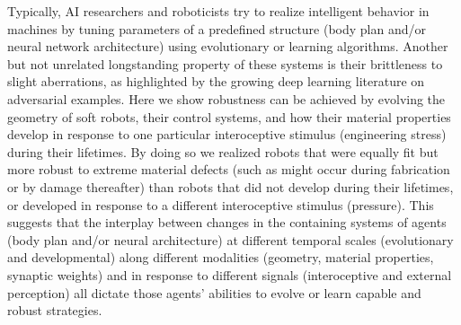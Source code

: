 \noindent
Typically, AI researchers and roboticists try to realize
intelligent behavior in machines by tuning parameters of a 
predefined structure (body plan and/or neural network
architecture) using evolutionary or learning algorithms. 
Another but not unrelated longstanding property of these systems is their brittleness to slight aberrations, as highlighted by the growing deep learning literature on adversarial examples.
Here we show robustness can be achieved by
evolving the 
geometry of soft robots, their
control systems, and how
their material properties develop
in response to one particular interoceptive stimulus
(engineering stress) during their lifetimes.
By doing so we realized robots that 
were equally fit but more robust to 
extreme material defects (such as 
might occur during fabrication or by damage thereafter)
than robots that did not develop during their lifetimes,
or developed in response to a different interoceptive
stimulus (pressure).
This suggests that the interplay between changes
in the containing systems
of agents (body plan and/or neural architecture)
at different temporal scales (evolutionary
and developmental) along different modalities
(geometry, material properties, synaptic weights)
and in response to different signals (interoceptive
and external perception) all
dictate those agents' abilities to evolve or 
learn capable and robust strategies. 






% 

% 

% 

% 


